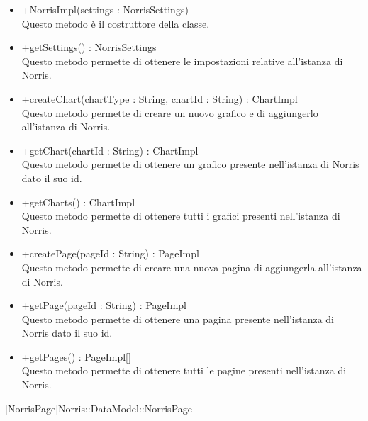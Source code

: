 \begin{itemize}
\begin{itemize}
					\item[\ding{111}] {{+NorrisImpl(settings : NorrisSettings)}} \\ [1mm] Questo metodo è il costruttore della classe.
					\item[\ding{111}] {{+getSettings() : NorrisSettings}} \\ [1mm] Questo metodo permette di ottenere le impostazioni relative all'istanza di Norris.
					\item[\ding{111}] {{+createChart(chartType : String, chartId : String) : ChartImpl}} \\ [1mm] Questo metodo permette di creare un nuovo grafico e di aggiungerlo all'istanza di Norris.
					\item[\ding{111}] {{+getChart(chartId : String) : ChartImpl}} \\ [1mm] Questo metodo permette di ottenere un grafico presente nell'istanza di Norris dato il suo id.
					\item[\ding{111}] {{+getCharts() : ChartImpl}} \\ [1mm] Questo metodo permette di ottenere tutti i grafici presenti nell'istanza di Norris.
					\item[\ding{111}] {{+createPage(pageId : String) : PageImpl}} \\ [1mm] Questo metodo permette di creare una nuova pagina di aggiungerla all'istanza di Norris.
					\item[\ding{111}] {{+getPage(pageId : String) : PageImpl}} \\ [1mm] Questo metodo permette di ottenere una pagina presente nell'istanza di Norris dato il suo id.
					\item[\ding{111}] {{+getPages() : PageImpl[]}} \\ [1mm] Questo metodo permette di ottenere tutti le pagine presenti nell'istanza di Norris.
				\end{itemize}
		
			\end{itemize}

			
			[NorrisPage]{Norris::DataModel::NorrisPage}
			

